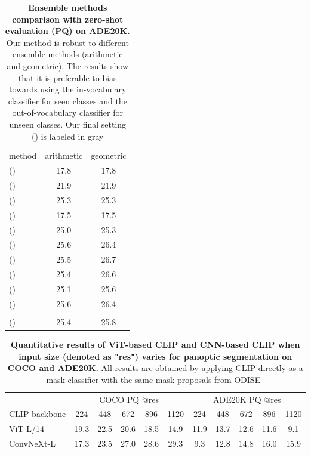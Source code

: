 \documentclass{article}
\newcommand{\baseline}[1]{\cellcolor{baselinecolor}{#1}}
\newcommand{\tablestyle}[2]{\setlength{\tabcolsep}{#1}\renewcommand{\arraystretch}{#2}\centering\footnotesize}
\begin{document}
\begin{table}[!t]
\tablestyle{6pt}{1.1}
\caption{
\textbf{Ensemble methods comparison with zero-shot evaluation (PQ) on ADE20K.}
Our method is robust to different ensemble methods (arithmetic and geometric).
The results show that it is preferable to bias towards using the in-vocabulary classifier for seen classes and the out-of-vocabulary classifier for unseen classes. Our final setting () is labeled in gray
}
\label{tab:ensemble_ablate}
\begin{tabular}{l|cc}
   method                    & arithmetic             & geometric            \\
   \shline
   () & 17.8 & 17.8   \\
   () & 21.9 & 21.9   \\
   () & 25.3 & 25.3   \\
   () & 17.5 & 17.5   \\
   () & 25.0 & 25.3   \\
   () & 25.6 & 26.4   \\
   () & 25.5 & 26.7   \\
   () & 25.4 & 26.6  \\
   () & 25.1 & 25.6   \\
   () & 25.6 & 26.4   \\
   \baseline{()} & \baseline{25.6} & \baseline{26.8}   \\
   () & 25.4 & 25.8   \\
   
\end{tabular}
\end{table}

\begin{table}[!t]
\tablestyle{2pt}{1.1}
\caption{
\textbf{Quantitative results of ViT-based CLIP and CNN-based CLIP when input size (denoted as "res") varies for panoptic segmentation on COCO and ADE20K.} All results are obtained by applying CLIP directly as a mask classifier with the same mask proposals from ODISE~\cite{xu2023open}
}
\label{tab:vit_vs_cnn_clip}
\begin{tabular}{l|ccccc|ccccc}
                              & \multicolumn{5}{c|}{COCO PQ @res}                & \multicolumn{5}{c}{ADE20K PQ @res}          \\
   CLIP backbone                    & 224            & 448            & 672   & 896 &  1120      & 224            & 448            & 672    & 896 & 1120        \\
   \shline
   ViT-L/14 & 19.3 & 22.5 & 20.6  & 18.5 & 14.9 & 11.9 & 13.7 & 12.6 & 11.6 & 9.1 \\ ConvNeXt-L  & 17.3 & 23.5 & 27.0 & 28.6 & 29.3 & 9.3 & 12.8 & 14.8 & 16.0 & 15.9
\end{tabular}
\end{table}
\end{document}
